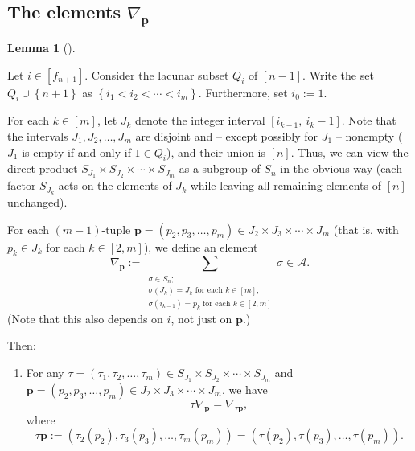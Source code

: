 \documentclass[numbers=enddot,12pt,final,onecolumn,notitlepage]{scrartcl}%
\theoremstyle{definition}
\newtheorem{lem}[theo]{Lemma}
\newenvironment{lemma}[1][]
{\begin{lem}[#1]\begin{leftbar}}
{\end{leftbar}\end{lem}}
\let\sumnonlimits\sum
\renewcommand{\sum}{\sumnonlimits\limits}
\begin{document}
\subsection{The elements $\nabla_{\mathbf{p}}$}

\begin{lemma}
\label{lem.Fi/Fi-1.L3}Let $i\in\left[  f_{n+1}\right]  $. Consider the lacunar
subset $Q_{i}$ of $\left[  n-1\right]  $. Write the set $Q_{i}\cup\left\{
n+1\right\}  $ as $\left\{  i_{1}<i_{2}<\cdots<i_{m}\right\}  $. Furthermore,
set $i_{0}:=1$.

For each $k\in\left[  m\right]  $, let $J_{k}$ denote the integer interval
$\left[  i_{k-1},\ i_{k}-1\right]  $. Note that the intervals $J_{1}%
,J_{2},\ldots,J_{m}$ are disjoint and -- except possibly for $J_{1}$ --
nonempty ($J_{1}$ is empty if and only if $1\in Q_{i}$), and their union is
$\left[  n\right]  $. Thus, we can view the direct product $S_{J_{1}}\times
S_{J_{2}}\times\cdots\times S_{J_{m}}$ as a subgroup of $S_{n}$ in the obvious
way (each factor $S_{J_{k}}$ acts on the elements of $J_{k}$ while leaving all
remaining elements of $\left[  n\right]  $ unchanged).

For each $\left(  m-1\right)  $-tuple $\mathbf{p}=\left(  p_{2},p_{3}%
,\ldots,p_{m}\right)  \in J_{2}\times J_{3}\times\cdots\times J_{m}$ (that is,
with $p_{k}\in J_{k}$ for each $k\in\left[  2,m\right]  $), we define an
element%
\[
\nabla_{\mathbf{p}}:=\sum_{\substack{\sigma\in S_{n};\\\sigma\left(
J_{k}\right)  =J_{k}\text{ for each }k\in\left[  m\right]  ;\\\sigma\left(
i_{k-1}\right)  =p_{k}\text{ for each }k\in\left[  2,m\right]  }}\sigma
\in\mathcal{A}.
\]
(Note that this also depends on $i$, not just on $\mathbf{p}$.)

Then:

\begin{enumerate}
\item[\textbf{(a)}] For any $\tau=\left(  \tau_{1},\tau_{2},\ldots,\tau
_{m}\right)  \in S_{J_{1}}\times S_{J_{2}}\times\cdots\times S_{J_{m}}$ and
$\mathbf{p}=\left(  p_{2},p_{3},\ldots,p_{m}\right)  \in J_{2}\times
J_{3}\times\cdots\times J_{m}$, we have%
\[
\tau\nabla_{\mathbf{p}}=\nabla_{\tau\mathbf{p}},
\]
where%
\[
\tau\mathbf{p}:=\left(  \tau_{2}\left(  p_{2}\right)  ,\tau_{3}\left(
p_{3}\right)  ,\ldots,\tau_{m}\left(  p_{m}\right)  \right)  =\left(
\tau\left(  p_{2}\right)  ,\tau\left(  p_{3}\right)  ,\ldots,\tau\left(
p_{m}\right)  \right)  .
\]



\end{enumerate}
\end{lemma}
\end{document}
